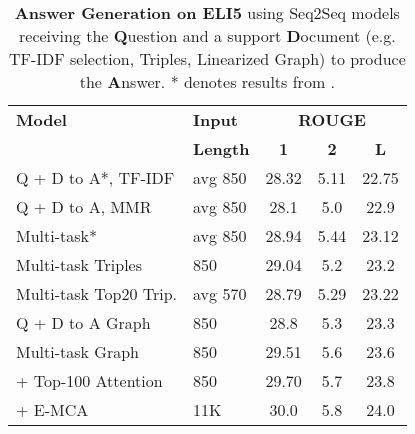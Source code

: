 \documentclass[11pt,a4paper]{article}
\newcommand*{\round}[1]{\num[round-mode=places,round-precision=1]{#1}}
\begin{document}
\begin{table}[t!]
  \centering \small
  \begin{tabular}{ l l c  c  c}\toprule
    \bf{Model} & \bf{Input} & \multicolumn{3}{c}{\bf{ROUGE}} \\
               & \textbf{Length} & \bf{1} & \bf{2} & \bf{L} \\\hline\hline
        Q + D to A*, TF-IDF & avg 850 & \round{28.32} & \round{5.11} & \round{22.75} \\
        Q + D to A, MMR & avg 850 & \round{28.1} & \round{5.0} & \round{22.9} \\
        Multi-task* & avg 850 & \round{28.94} & \round{5.44} & \round{23.12} \\ 
        \hline         
        Multi-task Triples  & 850 & \round{29.04} & \round{5.2}  & \round{23.2} \\ 
        Multi-task Top20 Trip. & avg 570 & \round{28.79} & \round{5.29} & \round{23.22} \\ 
        \hline 
        Q + D to A Graph    & 850 & \round{28.8} & 5.3 & 23.3 \\ 
        Multi-task Graph    & 850 & \round{29.51} & \round{5.6} & \round{23.6} \\ 
        + Top-100 Attention  & 850 & \round{29.70} & \round{5.7} & \round{23.8}\\ 
        + E-MCA & 11K & \round{30.0} & \round{5.8} & \round{24.0} \\ 
        \bottomrule
\end{tabular}
   \caption{\textbf{Answer Generation on ELI5} using Seq2Seq models receiving the \textbf{Q}uestion and a support \textbf{D}ocument (e.g. TF-IDF selection, Triples, Linearized Graph) to produce the \textbf{A}nswer. * denotes results from \cite{fan2019explain}.}
 \label{tbl:full_rouge_answer}
\end{table}
\end{document}
